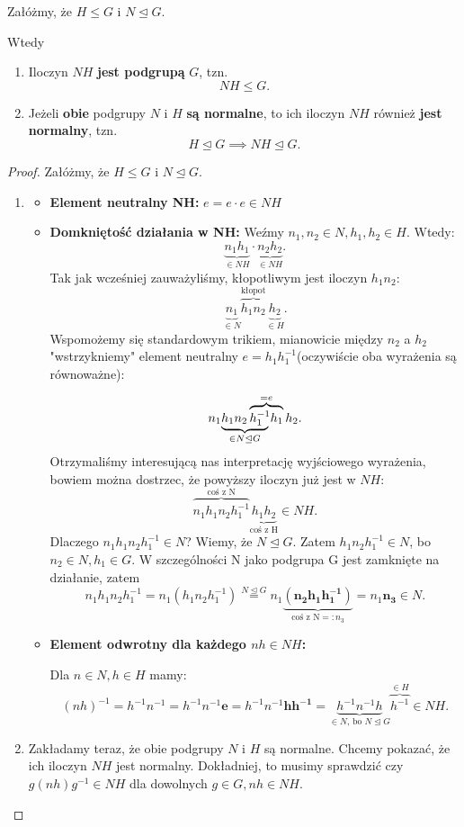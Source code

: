 \begin{theorem}

	Załóżmy, że $H\le G$ i $N \unlhd G$. 

	Wtedy
	\begin{enumerate}
		\item Iloczyn $NH$ \textbf{jest podgrupą} $G$, tzn. 
			\[
			NH\le G
			.\] 
		\item Jeżeli \textbf{obie} podgrupy $N$ i $H$ \textbf{są normalne}, to ich iloczyn $NH$ również \textbf{jest normalny}, tzn.
			\[
			H\unlhd G \implies NH \unlhd G
			.\] 
	\end{enumerate}
\end{theorem}
\begin{proof}
Załóżmy, że $H\le G$ i $N\unlhd G$.
	\begin{enumerate}
		\item 
			\begin{itemize}
				\item\textbf{Element neutralny NH:} $e = e\cdot e \in NH$
				\item\textbf{Domkniętość działania w NH:} Weźmy $n_1,n_2\in N, h_1,h_2 \in H.$ Wtedy:
					\[
						\underbrace{n_1h_1}_{\in NH} \cdot \underbrace{n_2h_2}_{\in NH}
					.\]
Tak jak wcześniej zauważyliśmy, kłopotliwym jest iloczyn $h_1n_2$:
\[
	\underbrace{n_1}_{\in N}\overbrace{h_1n_2}^{\text{kłopot}}\underbrace{h_2}_{\in H}
.\] 
Wspomożemy się standardowym trikiem, mianowicie między $n_2$ a $h_2$ "wstrzykniemy" element neutralny $e = h_1h_1^{-1}$(oczywiście oba wyrażenia są równoważne):
	
\[ n_1\rlap{$\underbrace{\phantom{h_1n_2h_1^{-1}}}_{\in N\unlhd G}$}h_1n_2\overbrace{h_1^{-1}h_1}^{= e}h_2 
.\] 
Otrzymaliśmy interesującą nas interpretację wyjściowego wyrażenia, bowiem można dostrzec, że powyższy iloczyn już jest w $NH$:
\[\overbrace{n_1h_1n_2h_1^{-1}}^{\text{coś z N}}\underbrace{h_1h_2}_{\text{coś z H}} \in NH
				.\] 
	Dlaczego $n_1h_1n_2h_1^{-1} \in N$? Wiemy, że $N\unlhd G$. Zatem $h_1n_2h_1^{-1} \in N$, bo $n_2\in N, h_1\in G$. W szczególności N jako podgrupa G jest zamknięte na działanie, zatem
	\[
		n_1h_1n_2h_1^{-1} = n_1\left( h_1n_2h_1^{-1}\right) \overset{N\unlhd G}{=} n_1\underbrace{\bm{\left( n_2h_1h_1^{-1}\right)}}_{\text{coś z N}=: n_3}= n_1\bm{n_3} \in N
	.\] 
\item\textbf{Element odwrotny dla każdego $nh\in NH$:}  

	Dla $n\in N, h \in H$ mamy:
	\[
		\left( nh \right)^{-1} =  h^{-1}n^{-1} = h^{-1}n^{-1}\bm{e} = h^{-1}n^{-1}\bm{hh^{-1}} = \underbrace{h^{-1}n^{-1}h}_{\in N\text{, bo }N\unlhd G}\overbrace{h^{-1}}^{\in H} \in NH
	.\] 
			\end{itemize}
		\item Zakładamy teraz, że obie podgrupy $N$ i $H$ są normalne. Chcemy pokazać, że ich iloczyn $NH$ jest normalny. Dokładniej, to musimy sprawdzić czy $g\left( nh \right) g^{-1}\in NH$ dla dowolnych $g\in G, nh \in NH$. 


\end{enumerate}
\end{proof}
